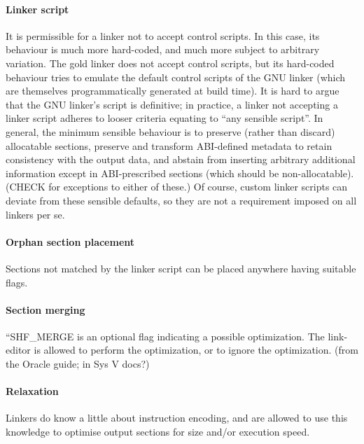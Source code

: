 \paragraph{Linker script}
It is permissible for a linker not to accept control scripts.
In this case, its behaviour is much more hard-coded,
and much more subject to arbitrary variation.
The \textsf{gold} linker does not accept control scripts, 
but its hard-coded behaviour tries to emulate the default control scripts of the GNU linker
(which are themselves programmatically generated at build time).
It is hard to argue that the GNU linker's script is definitive; 
in practice, a linker not accepting a linker script
adheres to looser criteria equating to ``any sensible script''.
In general, the minimum sensible 
behaviour is to preserve (rather than discard) allocatable sections, 
preserve and transform ABI-defined metadata to retain consistency with the output data,
and abstain from inserting arbitrary additional information
except in ABI-prescribed sections (which should be non-allocatable).  (CHECK for exceptions to either of these.)
Of course, custom linker scripts can deviate from these sensible defaults,
so they are not a requirement imposed on all linkers per se.

\paragraph{Orphan section placement}
Sections not matched by the linker script can be placed anywhere
having suitable flags.

\paragraph{Section merging}
``SHF\_MERGE is an optional flag indicating a possible optimization. The link-editor is allowed to perform the optimization, or to ignore the optimization. 
(from the Oracle guide; in Sys V docs?)

\paragraph{Relaxation}
Linkers do know a little about instruction encoding, and are allowed
to use this knowledge to optimise output sections
for size and/or execution speed.
